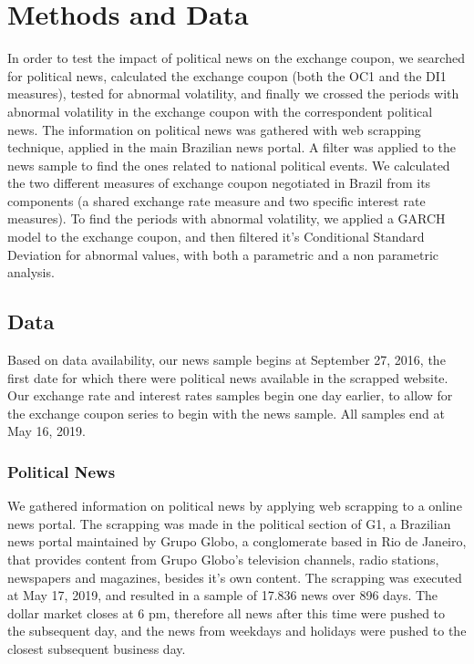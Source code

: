 \documentclass[cic,tc, english]{iiufrgs}
\begin{document}
\chapter{Methods and Data} \label{chapter_methods_data}

    In order to test the impact of political news on the exchange coupon, we searched for political news, calculated the exchange coupon (both the OC1 and the DI1 measures), tested for abnormal volatility, and finally we crossed the periods with abnormal volatility in the exchange coupon with the correspondent political news. The information on political news was gathered with web scrapping technique, applied in the main Brazilian news portal. A filter was applied to the news sample to find the ones related to national political events. We calculated the two different measures of exchange coupon negotiated in Brazil from its components (a shared exchange rate measure and two specific interest rate measures). To find the periods with abnormal volatility, we applied a GARCH model to the exchange coupon, and then filtered it's Conditional Standard Deviation for abnormal values, with both a parametric and a non parametric analysis.

\section{Data} \label{chapter_data}

    Based on data availability, our news sample begins at September 27, 2016, the first date for which there were political news available in the scrapped website. Our exchange rate and interest rates samples begin one day earlier, to allow for the exchange coupon series to begin with the news sample. All samples end at May 16, 2019.

\subsection{Political News} \label{chapter_political_news}
    
    We gathered information on political news by applying web scrapping to a online news portal. The scrapping was made in the political section of G1, a Brazilian news portal maintained by Grupo Globo, a conglomerate based in Rio de Janeiro, that provides content from Grupo Globo's television channels, radio stations, newspapers and magazines, besides it's own content. The scrapping was executed at May 17, 2019, and resulted in a sample of 17.836 news over 896 days. The dollar market closes at 6 pm, therefore all news after this time were pushed to the subsequent day, and the news from weekdays and holidays were pushed to the closest subsequent business day.
\end{document}
